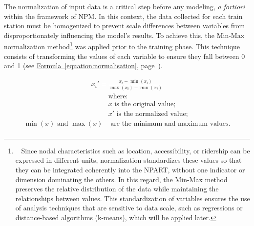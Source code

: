 \begin{refsegment}
The normalization of input data is a critical step before any modeling, \textsl{a fortiori} within the framework of \acrshort{NPM}. In this context, the data collected for each train station must be homogenized to prevent scale differences between variables from disproportionately influencing the model's results. To achieve this, the Min-Max normalization method\footnote{~
    Since nodal characteristics such as location, accessibility, or ridership can be expressed in different units, normalization standardizes these values so that they can be integrated coherently into the \acrshort{NPART}, without one indicator or dimension dominating the others. In this regard, the Min-Max method preserves the relative distribution of the data while maintaining the relationships between values. This standardization of variables ensures the use of analysis techniques that are sensitive to data scale, such as regressions or distance-based algorithms (k-means), which will be applied later.
} was applied prior to the training phase. This technique consists of transforming the values of each variable to ensure they fall between 0 and 1 (see \hyperref[equation:normalisation]{Formula~\ref{equation:normalisation}}, page~\pageref{equation:normalisation}).%

\begin{equation}
\label{equation:normalisation}
\begin{aligned}
x_i' = \frac{x_i - \min(x_i)}{\max(x_i) - \min(x_i)}
\end{aligned}
\end{equation}
\begin{align*}
    &\text{where:}\\
    &x \text{ is the original value;}\\
    &x' \text{ is the normalized value;}\\
    \min(x) \text{ and } \max(x) & \text{ are the minimum and maximum values.}\\
\end{align*}%


\end{refsegment}
